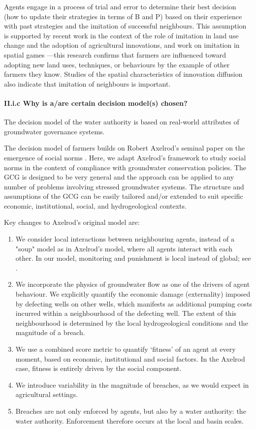 \documentclass[12pt, a4paper]{article}
\begin{document}
Agents engage in a process of trial and error to determine their best decision (how to update their strategies in terms of B and P) based on their experience with past strategies and the imitation of successful neighbours. This assumption is supported by recent work in the context of the role of imitation in land use change and the adoption of agricultural innovations, and work on imitation in spatial games \autocite{Gotts:2009td}—this research confirms that farmers are influenced toward adopting new land uses, techniques, or behaviours by the example of other farmers they know. Studies of the spatial characteristics of innovation diffusion also indicate that imitation of neighbours is important.

\paragraph{II.i.c Why is a/are certain decision model(s) chosen?}

The decision model of the water authority is based on real-world attributes of groundwater governance systems.

The decision model of farmers builds on Robert Axelrod's seminal paper on the emergence of social norms \autocite{Axelrod:1986vx}. Here, we adapt Axelrod's framework to study social norms in the context of compliance with groundwater conservation policies. The GCG is designed to be very general and the approach can be applied to any number of problems involving stressed groundwater systems. The structure and assumptions of the GCG can be easily tailored and/or extended to suit specific economic, institutional, social, and hydrogeological contexts.

Key changes to Axelrod's original model are:

\begin{enumerate} \def\labelenumi{\arabic{enumi}.} \item We consider local interactions between neighbouring agents, instead of a "soup" model as in Axelrod's model, where all agents interact with each other. In our model, monitoring and punishment is local instead of global; see \autocite{Gotts:2009td}. \item We incorporate the physics of groundwater flow as one of the drivers of agent behaviour. We explicitly quantify the economic damage (externality) imposed by defecting wells on other wells, which manifests as additional pumping costs incurred within a neighbourhood of the defecting well. The extent of this neighbourhood is determined by the local hydrogeological conditions and the magnitude of a breach. \item We use a combined score metric to quantify `fitness' of an agent at every moment, based on economic, institutional and social factors. In the Axelrod case, fitness is entirely driven by the social component. \item We introduce variability in the magnitude of breaches, as we would expect in agricultural settings. \item Breaches are not only enforced by agents, but also by a water authority: the water authority. Enforcement therefore occurs at the local and basin scales. \end{enumerate}
\end{document}
